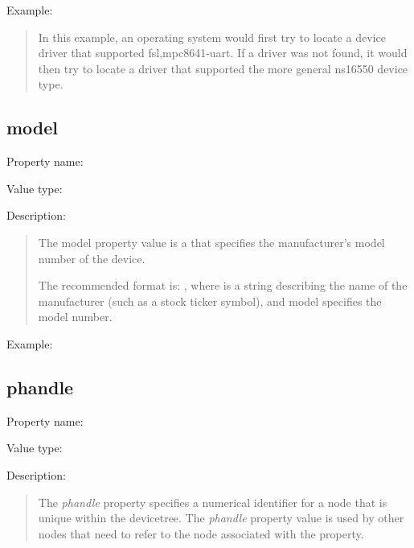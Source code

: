 \documentclass[a4paper,10pt,oneside]{sphinxmanual}
\begin{document}
Example:
\begin{quote}


In this example, an operating system would first try to locate a device
driver that supported fsl,mpc8641-uart. If a driver was not found, it
would then try to locate a driver that supported the more general
ns16550 device type.
\end{quote}


\subsection{model}
\label{devicetree-basics:model}
Property name: 

Value type: 

Description:
\begin{quote}

The model property value is a  that specifies the manufacturer’s
model number of the device.

The recommended format is: , where
 is a string describing the name of the manufacturer
(such as a stock ticker symbol), and model specifies the model number.
\end{quote}

Example:
\begin{quote}

\end{quote}


\subsection{phandle}
\label{devicetree-basics:sect-standard-properties-phandle}\label{devicetree-basics:phandle}
Property name: 

Value type: 

Description:
\begin{quote}

The \emph{phandle} property specifies a numerical identifier for a node that
is unique within the devicetree. The \emph{phandle} property value is used
by other nodes that need to refer to the node associated with the
property.
\end{quote}
\end{document}
